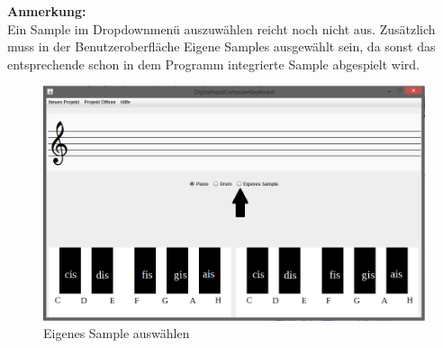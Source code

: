              
             
\textbf{Anmerkung:}\\

Ein Sample im Dropdownmenü auszuwählen reicht noch nicht aus. Zusätzlich muss in der Benutzeroberfläche Eigene Samples ausgewählt sein, da sonst das entsprechende schon in dem Programm integrierte Sample abgespielt wird.

\begin{figure}[hbtp]
\centering
\includegraphics[scale=0.6]{Bilder/Projektbild1EigenesSample.PNG}
\caption{Eigenes Sample auswählen}
\end{figure}

             
             
             
             
             
             
             
             
             
             